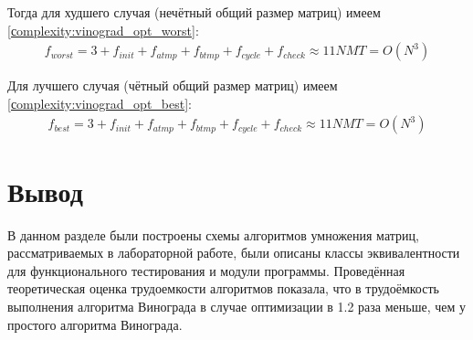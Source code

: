 Тогда для худшего случая (нечётный общий размер матриц) имеем \ref{сomplexity:vinograd_opt_worst}:
\begin{equation}
	\label{сomplexity:vinograd_opt_worst}
	\begin{aligned}
		f_{worst} = 3 + f_{init} + f_{atmp} + f_{btmp} + f_{cycle} + f_{check} \approx 11NMT = O(N^3)
	\end{aligned}
\end{equation}

Для лучшего случая (чётный общий размер матриц) имеем \ref{сomplexity:vinograd_opt_best}:
\begin{equation}
	\label{сomplexity:vinograd_opt_best}
	\begin{aligned}
		f_{best} = 3 + f_{init} + f_{atmp} + f_{btmp} + f_{cycle} + f_{check} \approx 11NMT = O(N^3)
	\end{aligned}
\end{equation}

\section*{Вывод}

В данном разделе были построены схемы алгоритмов умножения матриц,
рассматриваемых в лабораторной работе, были описаны классы эквивалентности для функционального тестирования и модули программы. Проведённая теоретическая оценка трудоемкости алгоритмов показала, что в трудоёмкость выполнения алгоритма Винограда в случае оптимизации в 1.2 раза меньше, чем у простого алгоритма Винограда.